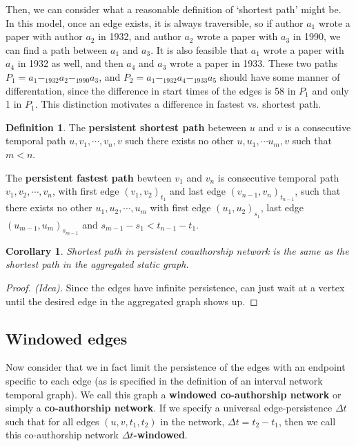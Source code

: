 \documentclass{article}
\newtheorem{cor}[thm]{Corollary}
\theoremstyle{definition}
\newtheorem{defn}[thm]{Definition}
\numberwithin{thm}{subsection}
\begin{document}
Then, we can consider what a reasonable definition of `shortest path' might be.
In this model, once an edge exists, it is always traversible, so if author
$a_1$ wrote a paper with author $a_2$ in 1932, and author $a_2$ wrote a paper with
$a_3$ in 1990, we can find a path between $a_1$ and $a_3$.  It is also feasible
that $a_1$ wrote a paper with $a_4$ in 1932 as well, and then $a_4$ and $a_3$
wrote a paper in 1933. These two paths $P_1 = a_1 -_{1932} a_2 -_{1990} a_3$, and
$P_2 = a_1 -_{1932} a_4 -_{1933} a_5$ should have some manner of differentation,
since the difference in start times of the edges is 58 in $P_1$ and only 1
in $P_1$. This distinction motivates a difference in fastest vs. shortest path.


\begin{defn}
  The \textbf{persistent shortest path} beteween $u$ and $v$ is a consecutive
  temporal path $u,v_1,\cdots,v_n,v$ such there exists no other $u,u_1, \cdots
  u_m,v$ such that $m < n$.

  The \textbf{persistent fastest path} bewteen $v_1$ and $v_n$ is consecutive
  temporal path $v_1,v_2,\cdots,v_n$, with first edge $(v_1,v_2)_{t_1}$ and last
  edge $(v_{n-1},v_n)_{t_{n-1}}$, such that there exists no other
  $u_1,u_2, \cdots, u_m$ with first edge $(u_1,u_2)_{s_1}$, last edge
  $(u_{m-1},u_m)_{s_{m-1}}$ and $s_{m-1} - s_1 < t_{n-1} - t_{1}$.
\end{defn}


\begin{cor}
  Shortest path in persistent coauthorship network is the same as the shortest
  path in the aggregated static graph.
\end{cor}

\begin{proof}[Proof. (Idea)]
  Since the edges have infinite persistence, can just wait at a vertex until
  the desired edge in the aggregated graph shows up.
\end{proof}


\subsection{Windowed edges}

Now consider that we in fact limit the persistence of the edges with an endpoint
specific to each edge (as is specified in the definition of an interval network
temporal graph). We call this graph a \textbf{windowed co-authorship network} or
simply a \textbf{co-authorship network}. If we specify a universal
edge-persistence $\Delta t$ such that for all edges $(u,v,t_1,t_2)$ in the
network, $\Delta t = t_2 - t_1$, then we call this co-authorship network
\textbf{$\Delta t$-windowed}.
\end{document}
